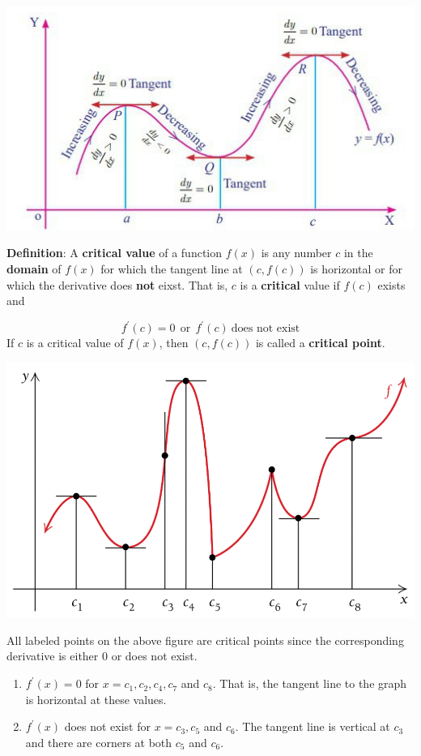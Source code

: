 \documentclass[
]{book}
\begin{document}
\begin{center}\includegraphics[width=0.6\linewidth]{img07/w07-CriticalValues} \end{center}

\textbf{Definition}: A \textbf{critical value} of a function \(f(x)\) is any number \(c\) in the \textbf{domain} of \(f(x)\) for which the tangent line at \((c, f(c))\) is horizontal or for which the derivative does \textbf{not} eixst. That is, \(c\) is a \textbf{critical} value if \(f(c)\) exists and

\[
f^\prime(c) = 0 ~ ~ \text{or}~~ f^\prime(c) ~ \text{does not exist}
\]
If \(c\) is a critical value of \(f(x)\), then \((c, f(c))\) is called a \textbf{critical point}.

\begin{center}\includegraphics[width=0.5\linewidth]{img07/w07-CriticalValues02} \end{center}

All labeled points on the above figure are critical points since the corresponding derivative is either 0 or does not exist.

\begin{enumerate}
\def\labelenumi{\arabic{enumi}.}
\item
  \(f^\prime(x) = 0\) for \(x = c_1, c_2, c_4, c_7\) and \(c_8\). That is, the tangent line to the graph is horizontal at these values.
\item
  \(f^\prime(x)\) does not exist for \(x = c_3, c_5\) and \(c_6\). The tangent line is vertical at \(c_3\) and there are corners at both \(c_5\) and \(c_6\).
\end{enumerate}
\end{document}

